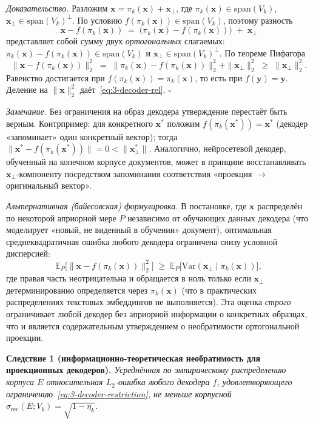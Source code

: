 \documentclass[a4paper, 12pt, oneside, openany]{article}
\begin{document}
\emph{Доказательство.} Разложим $\mathbf{x} = \pi_k(\mathbf{x}) + \mathbf{x}_{\perp}$, где $\pi_k(\mathbf{x}) \in \mathrm{span}(V_k)$, $\mathbf{x}_{\perp} \in \mathrm{span}(V_k)^{\perp}$. По условию $f(\pi_k(\mathbf{x})) \in \mathrm{span}(V_k)$, поэтому разность
\[
	\mathbf{x} - f(\pi_k(\mathbf{x})) \;=\; \bigl(\pi_k(\mathbf{x}) - f(\pi_k(\mathbf{x}))\bigr) \;+\; \mathbf{x}_{\perp}
\]
представляет собой сумму двух \emph{ортогональных} слагаемых: $\pi_k(\mathbf{x}) - f(\pi_k(\mathbf{x})) \in \mathrm{span}(V_k)$ и $\mathbf{x}_{\perp} \in \mathrm{span}(V_k)^{\perp}$. По теореме Пифагора
\[
	\| \mathbf{x} - f(\pi_k(\mathbf{x})) \|_{2}^{2} \;=\; \| \pi_k(\mathbf{x}) - f(\pi_k(\mathbf{x})) \|_{2}^{2} + \| \mathbf{x}_{\perp} \|_{2}^{2} \;\geq\; \| \mathbf{x}_{\perp} \|_{2}^{2}.
\]
Равенство достигается при $f(\pi_k(\mathbf{x})) = \pi_k(\mathbf{x})$, то есть при $f(\mathbf{y}) = \mathbf{y}$. Деление на $\| \mathbf{x} \|_{2}^{2}$ даёт~\eqref{eq:3-decoder-rel}. $\square$

\emph{Замечание.} Без ограничения на образ декодера утверждение перестаёт быть верным. Контрпример: для конкретного $\mathbf{x}^{*}$ положим $f(\pi_k(\mathbf{x}^{*})) = \mathbf{x}^{*}$ (декодер «запоминает» один конкретный вектор); тогда $\|\mathbf{x}^{*} - f(\pi_k(\mathbf{x}^{*}))\| = 0 < \|\mathbf{x}^{*}_{\perp}\|$. Аналогично, нейросетевой декодер, обученный на конечном корпусе документов, может в принципе восстанавливать $\mathbf{x}_{\perp}$-компоненту посредством запоминания соответствия «проекция $\to$ оригинальный вектор». 

\emph{Альтернативная (байесовская) формулировка.} В постановке, где $\mathbf{x}$ распределён по некоторой априорной мере $P$ независимо от обучающих данных декодера (что моделирует «новый, не виденный в обучении» документ), оптимальная среднеквадратичная ошибка любого декодера ограничена снизу условной дисперсией:
\[
	\mathbb{E}_{P}\bigl[\| \mathbf{x} - f(\pi_k(\mathbf{x})) \|_{2}^{2}\bigr] \;\geq\; \mathbb{E}_{P}\bigl[\mathrm{Var}(\mathbf{x}_{\perp} \mid \pi_k(\mathbf{x}))\bigr],
\]
где правая часть неотрицательна и обращается в ноль только если $\mathbf{x}_{\perp}$ детерминированно определяется через $\pi_k(\mathbf{x})$ (что в практических распределениях текстовых эмбеддингов не выполняется). Эта оценка \emph{строго} ограничивает любой декодер без априорной информации о конкретных образцах, что и является содержательным утверждением о необратимости ортогональной проекции.

\textbf{Следствие 1 (информационно-теоретическая необратимость для проекционных декодеров).} \emph{Усреднённая по эмпирическому распределению корпуса $E$ относительная $L_2$-ошибка любого декодера $f$, удовлетворяющего ограничению~\eqref{eq:3-decoder-restriction}, не меньше корпусной $\sigma_{\mathrm{rec}}(E; V_k) = \sqrt{1 - \eta_k}$.}
\end{document}
